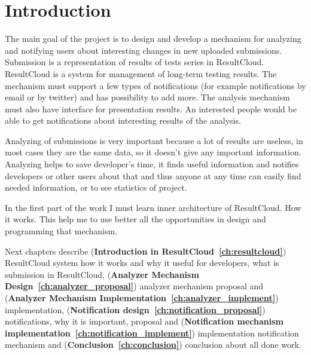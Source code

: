 
\chapter{Introduction}

The main goal of the project is to design and develop a mechanism for analyzing and notifying users about interesting changes in new uploaded submissions. Submission is a representation of results of tests series in ResultCloud. ResultCloud is a system for management of long-term testing results. The mechanism must support a few types of notifications (for example notifications by email or by twitter) and has possibility to add more. The analysis mechanism must also have interface for presentation results. An interested people would be able to get notifications about interesting results of the analysis.

Analyzing of submissions is very important because a lot of results are useless, in most cases they are the same data, so it doesn't give any important information. Analyzing helps to save developer's time, it finds useful information and notifies developers or other users about that and thus anyone at any time can easily find needed information, or to see statistics of project.

In the first part of the work I must learn inner architecture of ResultCloud. How it works. This help me to use better all the opportunities in design and programming that mechanism.

Next chapters describe (\textbf{Introduction in ResultCloud\ \ref{ch:resultcloud}}) ResultCloud system how it works and why it useful for developers, what is submission in ResultCloud, (\textbf{Analyzer Mechanism Design\ \ref{ch:analyzer_proposal}}) analyzer mechanism proposal and (\textbf{Analyzer Mechanism Imple\-me\-nta\-tion\ \ref{ch:analyzer_implement}}) implementation, (\textbf{Notification design\ \ref{ch:notification_proposal}}) notifications, why it is important, proposal and (\textbf{Notification mechanism implementation\ \ref{ch:notification_implement}}) implementation notification mechanism and (\textbf{Conclusion\ \ref{ch:conclusion}}) conclusion about all done work.

